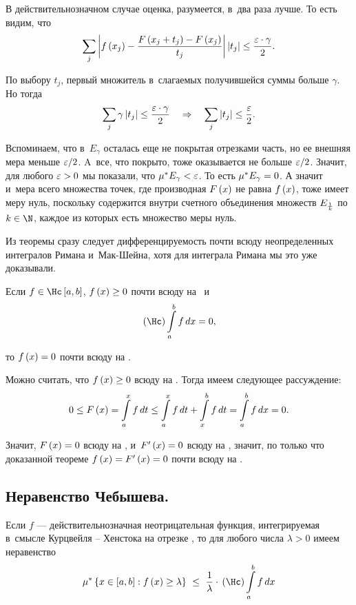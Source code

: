 \documentclass[draft]{article}
\begin{document}
В действительнозначном случае оценка, разумеется, в~два раза лучше.
То есть видим, что
$$\sumj\abs{f\at(x_j)-{F\at(x_j+t_j)-F\at(x_j)\over
t_j}}\abs{t_j}\le{\ep\cdot\gamma\over2}.$$

По выбору $t_j$, первый множитель в~слагаемых получившейся суммы
больше $\gamma$. Но тогда
$$\sum\limits_j\gamma\left|t_j\right|\le{\varepsilon\cdot\gamma\over2}\quad
\Rightarrow\quad\sum\limits_j\left|t_j\right|\le{\varepsilon\over2}.$$

Вспоминаем, что в~$E_\gamma$ осталась еще не покрытая отрезками
часть, но ее внешняя мера меньше $\varepsilon/2$. A~все, что покрыто, тоже
оказывается не больше $\varepsilon/2$. Значит, для любого $\varepsilon > 0$ мы
показали, что $\mu^* E_\gamma<\varepsilon$. То есть $\mu^* E_\gamma=0$. А
значит и~мера всего множества точек, где производная $F\atx$ не
равна $f\atx$, тоже имеет меру нуль, поскольку содержится внутри
счетного объединения  множеств $E_{1\over k}$ по $k\in\N$, каждое из
которых есть множество меры нуль.

\prtm

\bigskip

{\small \rem

Из теоремы сразу следует дифференцируемость почти всюду
неопределенных интегралов Римана и~Мак-Шейна, хотя для интеграла
Римана мы это уже доказывали.}

\bigskip

\imp

Если $f\iskurzh[a,b]$, $f\atx\ge0$ почти всюду на \ab\ и
$$\kurzh\intabfdx=0,$$

то $f\atx=0$ почти всюду на \ab.

\pr

Можно считать, что $f\atx\ge0$ всюду на \ab. Тогда имеем следующее
рассуждение:
$$0\le F\atx=\intd[a,x]f,t\le\intd[a,x]f,t+\intd[x,b]f,t=\intabfdx=0.$$

Значит, $F\atx=0$ всюду на \ab, и~$F'\atx=0$ всюду на \ab, значит,
по только что доказанной теореме $f\atx=F'\atx=0$ почти всюду на
\ab.

\primp

\eject

\subsection{Неравенство Чебышева.}


Если $f$ --- действительнозначная неотрицательная функция,
интегрируемая в~смысле Курцвейля -- Хенстока на отрезке \ab, то для
любого числа $\lambda > 0$ имеем неравенство
$$\mes\set{x\in\segab:f\atx \ge \lambda}\ \le\ {1\over\lambda}\cdot\kurzh\intabfdx$$
\end{document}
